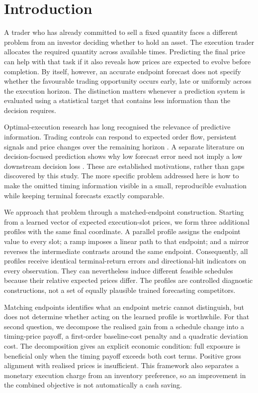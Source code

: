 \section{Introduction}\label{sec:intro}
A trader who has already committed to sell a fixed quantity faces a different problem from an investor deciding whether to hold an asset. The execution trader allocates the required quantity across available times. Predicting the final price can help with that task if it also reveals how prices are expected to evolve before completion. By itself, however, an accurate endpoint forecast does not specify whether the favourable trading opportunity occurs early, late or uniformly across the execution horizon. The distinction matters whenever a prediction system is evaluated using a statistical target that contains less information than the decision requires.

Optimal-execution research has long recognised the relevance of predictive information. Trading controls can respond to expected order flow, persistent signals and price changes over the remaining horizon \citep{cartea2016,lehalle2019,forde2022,abijaber2025}. A separate literature on decision-focused prediction shows why low forecast error need not imply a low downstream decision loss \citep{elmachtoub2022,mandi2024}. These are established motivations, rather than gaps discovered by this study. The more specific problem addressed here is how to make the omitted timing information visible in a small, reproducible evaluation while keeping terminal forecasts exactly comparable.

We approach that problem through a matched-endpoint construction. Starting from a learned vector of expected execution-slot prices, we form three additional profiles with the same final coordinate. A parallel profile assigns the endpoint value to every slot; a ramp imposes a linear path to that endpoint; and a mirror reverses the intermediate contrasts around the same endpoint. Consequently, all profiles receive identical terminal-return errors and directional-hit indicators on every observation. They can nevertheless induce different feasible schedules because their relative expected prices differ. The profiles are controlled diagnostic constructions, not a set of equally plausible trained forecasting competitors.

Matching endpoints identifies what an endpoint metric cannot distinguish, but does not determine whether acting on the learned profile is worthwhile. For that second question, we decompose the realised gain from a schedule change into a timing-price payoff, a first-order baseline-cost penalty and a quadratic deviation cost. The decomposition gives an explicit economic condition: full exposure is beneficial only when the timing payoff exceeds both cost terms. Positive gross alignment with realised prices is insufficient. This framework also separates a monetary execution charge from an inventory preference, so an improvement in the combined objective is not automatically a cash saving.

